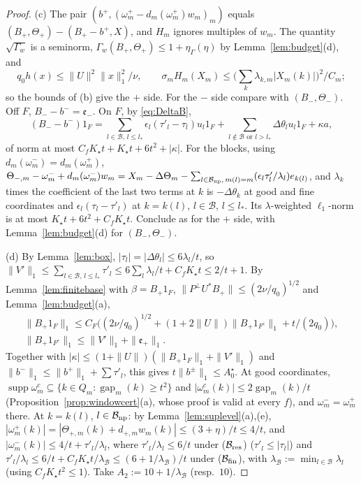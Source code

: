 \documentclass[10pt]{amsart}
\theoremstyle{definition}
\theoremstyle{remark}
\newcommand{\supp}{\operatorname{supp}}
\newcommand{\gap}{\operatorname{gap}}
\begin{document}
\begin{proof}
(c) The pair $(b^+,(\omega^+_m-d_m(\omega^+_m)w_m)_m)$ equals
$(B_+,\Theta_+)-(B_+-b^+,X)$, and $H_m$ ignores multiples of $w_m$.  The
quantity $\sqrt{\Gamma_w}$ is a seminorm, $\Gamma_w(B_+,\Theta_+)\le1+
\eta_\Gamma(\eta)$ by Lemma~\ref{lem:budget}(d), and
\[
 q_0h(x)\le\|U\|^2\|x\|_1^2/\nu,\qquad\sigma_mH_m(X_m)\le\Big(\sum_k
 \lambda_{k,m}|X_m(k)|\Big)^2/C_m ;
\]
so the bounds of (b) give the $+$ side.  For the $-$ side compare with $(B_-,\Theta_-)$.  Off
$F$, $B_--b^-=\mathfrak e_-$.  On $F$, by \eqref{eq:DeltaB},
\[
 (B_--b^-)1_F=\sum_{l\in\mathcal B,\,l\le l_*}\epsilon_l(\tau'_l-\tau_l)u_l1_F
 +\sum_{l\notin\mathcal B\text{ or }l>l_*}\Delta\theta_lu_l1_F+\kappa a,
\]
of norm at most $C_fK_\star t+K_\star t+6t^2+|\kappa|$.  For the blocks,
using $d_m(\omega^-_m)=d_m(\omega^+_m)$,
$\Theta_{-,m}-\omega^-_m+d_m(\omega^-_m)w_m=X_m-\Delta\Theta_m-\sum_{l\in
\mathcal B_{\rm np},\,m(l)=m}(\epsilon_l\tau'_l/\lambda_l)e_{k(l)}$, and
$\lambda_k$ times the coefficient of the last two terms at $k$ is
$-\Delta\theta_k$ at good and fine coordinates and $\epsilon_l(\tau_l-
\tau'_l)$ at $k=k(l)$, $l\in\mathcal B$, $l\le l_*$.  Its $\lambda$-weighted
$\ell_1$-norm is at most $K_\star t+6t^2+C_fK_\star t$.  Conclude as for the
$+$ side, with Lemma~\ref{lem:budget}(d) for $(B_-,\Theta_-)$.

(d) By Lemma~\ref{lem:box}, $|\tau_l|=|\Delta\theta_l|\le6\lambda_l/t$, so
$\|V'\|_1\le\sum_{l\in\mathcal B,\,l\le l_*}\tau'_l\le6\sum_l\lambda_l/t+
C_fK_\star t\le2/t+1$.  By Lemma~\ref{lem:finitebase} with $\beta=B_+1_F$,
$\|P^\perp U^*B_+\|\le(2\nu/q_0)^{1/2}$ and Lemma~\ref{lem:budget}(a),
\begin{gather*}
 \|B_+1_F\|_1\le C_F\big((2\nu/q_0)^{1/2}+(1+2\|U\|)\|B_+1_{F^c}\|_1+
 t/(2q_0)\big),\\
 \|B_+1_{F^c}\|_1\le\|V'\|_1+\|\mathfrak e_+\|_1 .
\end{gather*}
Together with $|\kappa|\le(1+\|U\|)(\|B_+1_F\|_1+\|V'\|_1)$ and
$\|b^-\|_1\le\|b^+\|_1+\sum\tau'_l$, this gives $t\|b^\pm\|_1\le A^\star_0$.
At good coordinates, $\supp\omega^c_m\subseteq\{k\in Q_m:\gap_m(k)\ge t^2\}$
and $|\omega^c_m(k)|\le2\gap_m(k)/t$ (Proposition~\ref{prop:windowcert}(a),
whose proof is valid at every $f$), and $\omega^-_m=\omega^+_m$ there.  At
$k=k(l)$, $l\in\mathcal B_{\rm np}$: by Lemma~\ref{lem:suplevel}(a),(e),
$|\omega^+_m(k)|=|\Theta_{+,m}(k)+d_{+,m}w_m(k)|\le(3+\eta)/t\le4/t$, and
$|\omega^-_m(k)|\le4/t+\tau'_l/\lambda_l$, where $\tau'_l/\lambda_l\le6/t$
under ($\mathcal B_{\rm res}$) ($\tau'_l\le|\tau_l|$) and
$\tau'_l/\lambda_l\le6/t+C_fK_\star t/\lambda_{\mathcal B}\le(6+1/
\lambda_{\mathcal B})/t$ under ($\mathcal B_{\rm fin}$), with
$\lambda_{\mathcal B}:=\min_{l\in\mathcal B}\lambda_l$ (using $C_fK_\star t^2
\le1$).  Take $A_2:=10+1/\lambda_{\mathcal B}$ (resp.\ $10$).
\end{proof}
\end{document}
